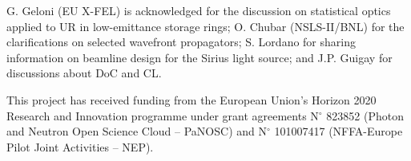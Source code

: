 \documentclass{iucr}              %
\begin{document}

{}

G. Geloni (EU X-FEL) is acknowledged for the discussion on statistical optics applied to UR in low-emittance storage rings; O. Chubar (NSLS-II/BNL) for the clarifications on selected wavefront propagators; S. Lordano for sharing information on beamline design for the Sirius light source; and J.P. Guigay for discussions about DoC and CL.


This project has received funding from the European Union’s Horizon 2020 Research and Innovation programme under grant agreements N$^{\circ}$ 823852 (Photon and Neutron Open Science Cloud -- PaNOSC) and N$^{\circ}$ 101007417 (NFFA-Europe Pilot Joint Activities -- NEP).

\newpage
{}

\end{document}
